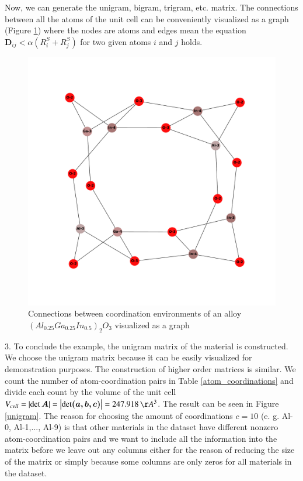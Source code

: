 \documentclass[11pt,oneside,czech,american]{book} %
\theoremstyle{definition} %
\theoremstyle{definition}
\begin{document}
Now, we can generate the unigram, bigram, trigram, etc. matrix. The connections between all the atoms of the unit cell can be conveniently visualized as a graph (Figure \ref{graph}) where the nodes are atoms and edges mean the equation $\bm{D}_{ij} < \alpha(R^S_i + R^S_j)$ for two given atoms $i$ and $j$ holds.
\begin{figure}[H]
	\centering
	\includegraphics[scale=0.5]{id_20_graph.pdf}
	\caption{Connections between coordination environments of an alloy $(Al_{0.25}Ga_{0.25}In_{0.5})_2 O_3$ visualized as a graph \parencite{networkx}}
	\label{graph}
\end{figure}

3. To conclude the example, the unigram matrix of the material is constructed. We choose the unigram matrix because it can be easily visualized for demonstration purposes. The construction of higher order matrices is similar. We count the number of atom-coordination pairs in Table \ref{atom_coordinations} and divide each count by the volume of the unit cell $V_{cell} = \left| \det \bm{A} \right| = \left| \det \bm{(\bm{a}, \bm{b}, \bm{c})} \right| = 247.918 \, \AA^3$. The result can be seen in Figure \ref{unigram}. The reason for choosing the amount of coordinations $c = 10$ (e. g. Al-0, Al-1,..., Al-9) is that other materials in the dataset have different nonzero atom-coordination pairs and we want to include all the information into the matrix before we leave out any columns either for the reason of reducing the size of the matrix or simply because some columns are only zeros for all materials in the dataset.
\end{document}
